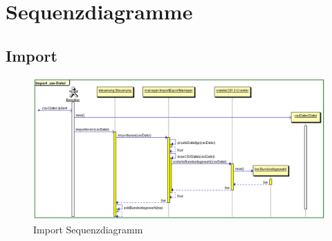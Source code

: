 \documentclass[12pt,a4paper,titlepage]{article}
\begin{document}
\section{Sequenzdiagramme}
\subsection{Import}
\begin{figure}[!ht]
\includegraphics[scale=0.5]{Sequenzdiagramme/Import_Sequenzdiagramm.png} \caption{Import Sequenzdiagramm} 
\end{figure}

\newpage
\end{document}
